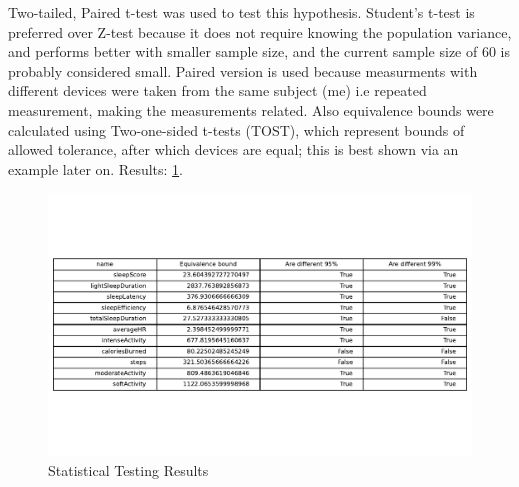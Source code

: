 Two-tailed, Paired t-test was used to test this hypothesis. Student's t-test is preferred over Z-test because it does not require knowing the population variance, and performs better with smaller sample size, and the current sample size of 60 is probably considered small. Paired version is used because measurments with different devices were taken from the same subject (me) i.e repeated measurement, making the measurements related. Also equivalence bounds were calculated using Two-one-sided t-tests (TOST), which represent bounds of allowed tolerance, after which devices are equal; this is best shown via an example later on. Results: \ref{fig:results}.

\begin{figure}
    
    \centering
    \includegraphics[width=\textwidth,keepaspectratio]{../images/results.pdf}
    \caption{Statistical Testing Results}
    \label{fig:results}
    
\end{figure}